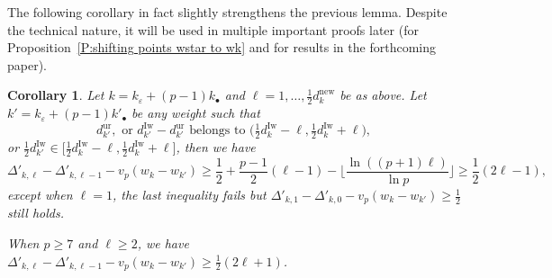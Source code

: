 \documentclass[12pt]{amsart}
\newtheorem{corollary}[subsection]{Corollary}
\theoremstyle{definition}
\numberwithin{equation}{subsection}
\newcommand{\new}{\mathrm{new}}
\newcommand{\Iw}{\mathrm{Iw}}
\newcommand{\ur}{\mathrm{ur}}
\begin{document}
The following corollary in fact slightly strengthens the previous lemma. Despite the technical nature, it will be used in multiple important proofs later (for Proposition~\ref{P:shifting points wstar to wk} and for results in the forthcoming paper).
\begin{corollary}
\label{C:finer inequality for Delta}
Let $k = k_\varepsilon + (p-1)k_\bullet$ and $\ell =1, \dots, \frac 12 d_k^\new$ be as above. Let $k' = k_\varepsilon + (p-1) k'_\bullet$ 
be any weight such that 
\begin{equation}
\label{E:dk' boundaries belongs to NS range} 
d_{k'}^\ur, \textrm{ or }d_{k'}^\Iw - d_{k'}^\ur\textrm{  belongs to }\big(\tfrac 12d_k^\Iw-\ell, \tfrac 12 d_k^\Iw+\ell\big)
,
\end{equation}
or $\frac 12d_{k'}^\Iw \in \big[\tfrac 12d_k^\Iw-\ell, \tfrac 12 d_k^\Iw+\ell\big]$,
then we have
\begin{equation}
\label{E:Delta kl difference strong}
\Delta'_{k, \ell} - \Delta'_{k,\ell-1} -v_p(w_k - w_{k'}) \geq \frac 12 + \frac {p-1}2(\ell-1) -\Big \lfloor \frac{\ln((p+1) \ell)}{\ln p}\Big\rfloor  \geq \frac 12 (2\ell-1),
\end{equation}
except when $\ell = 1$, the last inequality fails but $\Delta'_{k, 1} - \Delta'_{k,0} - v_p(w_{k} - w_{k'}) \geq \frac 12$ still holds.

When $p \geq 7$ and $\ell \geq 2$, we have
$\Delta'_{k, \ell} - \Delta'_{k,\ell-1}-v_p(w_{k}-w_{k'}) \geq \frac 12(2\ell+1)$.
\end{corollary}
\end{document}
